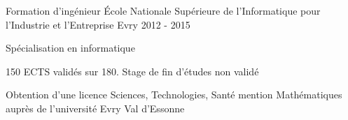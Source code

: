 
\begin{cventries}



\cventry
{Formation d'ingénieur}
{\'Ecole Nationale Supérieure de l'Informatique pour l'Industrie et l'Entreprise}
{Evry}
{2012 - 2015}
{
	\begin{cvitems}
	\item{Spécialisation en informatique}
	\item{ 150 ECTS validés sur 180. Stage de fin d'études non validé}
	\item{Obtention d'une licence Sciences, Technologies, Santé mention Mathématiques auprès de l'université Evry Val d'Essonne}
	\end{cvitems}
}


\end{cventries}